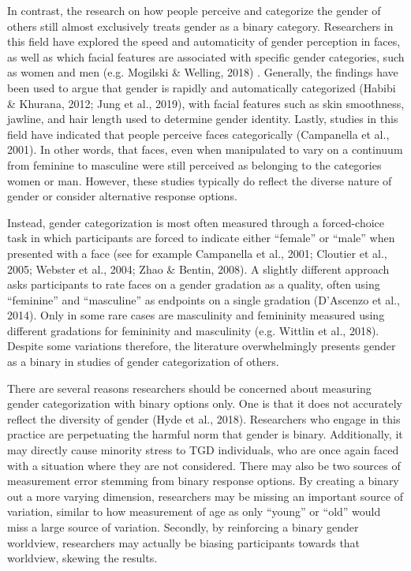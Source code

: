 \documentclass[
  man]{apa7}
\begin{document}
In contrast, the research on how people perceive and categorize the gender of others still almost exclusively treats gender as a binary category. Researchers in this field have explored the speed and automaticity of gender perception in faces, as well as which facial features are associated with specific gender categories, such as women and men (e.g. Mogilski \& Welling, 2018) . Generally, the findings have been used to argue that gender is rapidly and automatically categorized (Habibi \& Khurana, 2012; Jung et al., 2019), with facial features such as skin smoothness, jawline, and hair length used to determine gender identity. Lastly, studies in this field have indicated that people perceive faces categorically (Campanella et al., 2001). In other words, that faces, even when manipulated to vary on a continuum from feminine to masculine were still perceived as belonging to the categories women or man. However, these studies typically do reflect the diverse nature of gender or consider alternative response options.

Instead, gender categorization is most often measured through a forced-choice task in which participants are forced to indicate either ``female'' or ``male'' when presented with a face (see for example Campanella et al., 2001; Cloutier et al., 2005; Webster et al., 2004; Zhao \& Bentin, 2008). A slightly different approach asks participants to rate faces on a gender gradation as a quality, often using ``feminine'' and ``masculine'' as endpoints on a single gradation (D'Ascenzo et al., 2014). Only in some rare cases are masculinity and femininity measured using different gradations for femininity and masculinity (e.g. Wittlin et al., 2018). Despite some variations therefore, the literature overwhelmingly presents gender as a binary in studies of gender categorization of others.

There are several reasons researchers should be concerned about measuring gender categorization with binary options only. One is that it does not accurately reflect the diversity of gender (Hyde et al., 2018). Researchers who engage in this practice are perpetuating the harmful norm that gender is binary. Additionally, it may directly cause minority stress to TGD individuals, who are once again faced with a situation where they are not considered. There may also be two sources of measurement error stemming from binary response options. By creating a binary out a more varying dimension, researchers may be missing an important source of variation, similar to how measurement of age as only ``young'' or ``old'' would miss a large source of variation. Secondly, by reinforcing a binary gender worldview, researchers may actually be biasing participants towards that worldview, skewing the results.
\end{document}
